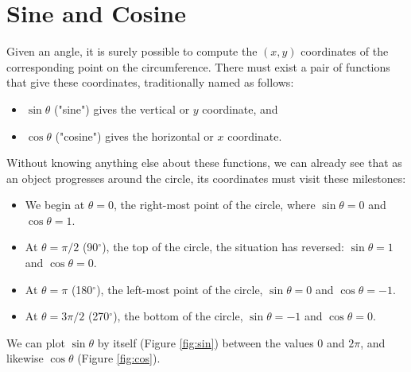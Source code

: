 \section{Sine and Cosine}

Given an angle, it is surely possible to compute the $(x, y)$ coordinates of the corresponding point on the circumference. There must exist a pair of functions that give these coordinates, traditionally named as follows:

\begin{itemize}
    \item $\sin \theta$ ("sine") gives the vertical or $y$ coordinate, and
    \item $\cos \theta$ ("cosine") gives the horizontal or $x$ coordinate.
\end{itemize}

Without knowing anything else about these functions, we can already see that as an object progresses around the circle, its coordinates must visit these milestones:

\begin{itemize}
    \item We begin at $\theta = 0$, the right-most point of the circle, where $\sin \theta = 0$ and $\cos \theta = 1$.
    \item At $\theta = \pi/2$ (90$^\circ$), the top of the circle, the situation has reversed: $\sin \theta = 1$ and $\cos \theta = 0$.
    \item At $\theta = \pi$ (180$^\circ$), the left-most point of the circle, $\sin \theta = 0$ and $\cos \theta = -1$.
    \item At $\theta = 3\pi/2$ (270$^\circ$), the bottom of the circle, $\sin \theta = -1$ and $\cos \theta = 0$.
\end{itemize}

We can plot $\sin \theta$ by itself (Figure \ref{fig:sin}) between the values $0$ and $2\pi$, and likewise $\cos \theta$ (Figure \ref{fig:cos}).

